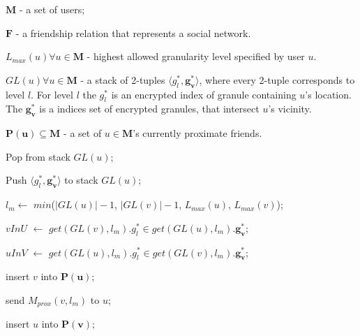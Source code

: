 \begin{algorithm}[!Hbt]		
    \dontprintsemicolon
    \SetVline
\footnotesize
    \KwData
    {    
\footnotesize

	$\mathbf{M}$ - a set of users;        

	$\mathbf{F}$ - a friendship relation that represents a social network. 
			
	$L_{max}(u) \forall u \in \mathbf{M}$ - highest allowed granularity level specified by user $u$.
                
  $GL(u) \forall u \in \mathbf{M}$ - a stack of 2-tuples $\langle g^*_l,
\mathbf{g^*_v} \rangle$, where every 2-tuple corresponds to level $l$.
For level $l$ the $g^*_l$ is an encrypted index of granule containing $u$'s location. 
The $\mathbf{g^*_v}$ is a indices set of encrypted granules, that intersect 
$u$'s vicinity.
      
        $\mathbf{P(u)} \subseteq \mathbf{M}$ - a set of $u \in \mathbf{M}$'s
currently proximate friends.
	 }        

\footnotesize 

    {
        {
            Pop from stack $GL(u)$;
        }

        Push $\langle g^*_l, \mathbf{g^*_v} \rangle$ to stack $GL(u)$;

        {
            $l_m \leftarrow$ $min$($|GL(u)|-1$, $|GL(v)|-1$, $L_{max}(u)$,
$L_{max}(v)$);

	    $vInU$ $\leftarrow$ $get(GL(v), l_m).g^*_l \in get(GL(u),
l_m).\mathbf{g^*_v}$;

	    $uInV$ $\leftarrow$ $get(GL(u), l_m).g^*_l \in get(GL(v),
l_m).\mathbf{g^*_v}$;

            {
                {
                    {
                    insert $v$ into $\mathbf{P(u)}$;
                    
                    send $M_{prox}(v, l_m)$ to \md $u$;
                    
                    }

                    {
                    insert $u$ into $\mathbf{P(v)}$;
                    
}}}}}
\end{algorithm}
